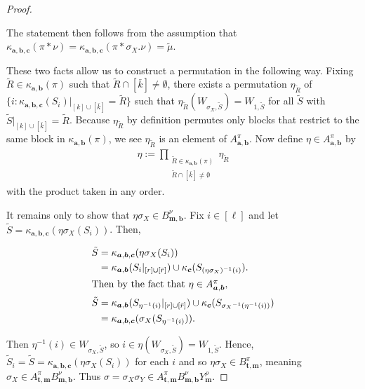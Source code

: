 \documentclass[ALCO,Unicode,published]{cedram}
\newcommand{\bfa}{{\boldsymbol{a}}}
\newcommand{\bfb}{{\boldsymbol{b}}}
\newcommand{\bfc}{{\boldsymbol{c}}}
\newcommand{\bft}{{\boldsymbol{t}}}
\newcommand{\bfm}{{\boldsymbol{m}}}
\newcommand{\tmu}{{\tilde{\mu}}}
\newcommand{\tS}{{\tilde{S}}}
\newcommand{\tR}{{\tilde{R}}}
\newcommand{\ov}[1]{\bar{#1}}
\newcommand{\ovb}[1]{\left[\ov{#1}\right]}
\begin{document}
\begin{proof}
\begin{enumerate}
The statement then follows from the assumption that $\kappa_{\bfa,\bfb,\bfc}(\pi\ast\nu)=\kappa_{\bfa,\bfb,\bfc}(\pi\ast \sigma_X.\nu)=\tmu$.
\end{enumerate}

These two facts allow us to construct a permutation in the following way. Fixing $\tR\in\kappa_{\bfa,\bfb}(\pi)$ such that $\tR\cap \ovb{k}\neq\emptyset$, there exists a permutation $\eta_{\tR}$ of $\{i:\kappa_{\bfa,\bfb,\bfc}(S_i)|_{[k]\cup\ovb{k}}=\tR\}$ such that $\eta_\tR(W_{\sigma_X,\tS})=W_{1,\tS}$ for all $\tS$ with $\tS|_{[k]\cup\ovb{k}}=\tR$. Because $\eta_\tR$ by definition permutes only blocks that restrict to the same block in $\kappa_{\bfa,\bfb}(\pi)$, we see $\eta_\tR$ is an element of $A_{\bfa,\bfb}^\pi$. Now define $\eta\in A_{\bfa,\bfb}^\pi$ by \begin{align*}
    \eta:=\prod_{\substack{\tR\in\kappa_{\bfa,\bfb}(\pi)\\\tR\cap\ovb{k}\neq\emptyset}}\eta_\tR
\end{align*} with the product taken in any order.

It remains only to show that $\eta\sigma_X\in B_{\bfm,\bfb}^\nu$. Fix $i\in[\ell]$ and let $\tS=\kappa_{\bfa,\bfb,\bfc}(\eta\sigma_X(S_i))$. Then,

\begin{align*}
    \tS&=\kappa_{\bfa,\bfb,\bfc}(\eta\sigma_X(S_i))\\
    &=\kappa_{\bfa,\bfb}(S_i|_{[r]\cup\ovb{r}})\cup\kappa_\bfc(S_{(\eta\sigma_X)^{-1}(i)}).\\
    \intertext{Then by the fact that $\eta\in A_{\bfa,\bfb}^\pi$,}
    \tS&=\kappa_{\bfa,\bfb}(S_{\eta^{-1}(i)}|_{[r]\cup\ovb{r}})\cup\kappa_\bfc(S_{{\sigma_X}^{-1}(\eta^{-1}(i))})\\
    &=\kappa_{\bfa,\bfb,\bfc}(\sigma_X(S_{\eta^{-1}(i)})).
\end{align*}

Then $\eta^{-1}(i)\in W_{\sigma_X,\tS}$, so $i\in \eta(W_{\sigma_X,\tS})=W_{1,\tS}$. Hence, $\tS_i=\tS=\kappa_{\bfa,\bfb,\bfc}(\eta\sigma_X(S_i))$ for each $i$ and so $\eta\sigma_X\in B^{\pi}_{\bft,\bfm}$, meaning $\sigma_X\in A_{\bft,\bfm}^\pi B_{\bfm,\bfb}^\nu$. Thus $\sigma=\sigma_X\sigma_Y\in A_{\bft,\bfm}^\pi B_{\bfm,\bfb}^\nu Y_\bfm^\rho$.
\end{proof}
\end{document}
